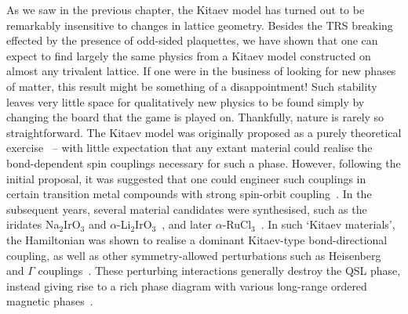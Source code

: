 
As we saw in the previous chapter, the Kitaev model has turned out to be remarkably insensitive to changes in lattice geometry. Besides the TRS breaking effected by the presence of odd-sided plaquettes, we have shown that one can expect to find largely the same physics from a Kitaev model constructed on almost any trivalent lattice. If one were in the business of looking for new phases of matter, this result might be something of a disappointment! Such stability leaves very little space for qualitatively new physics to be found simply by changing the board that the game is played on. Thankfully, nature is rarely so straightforward. The Kitaev model was originally proposed as a purely theoretical exercise~\cite{kitaev_anyons_2006} -- with little expectation that any extant material could realise the bond-dependent spin couplings necessary for such a phase. However, following the initial proposal, it was suggested that one could engineer such couplings in certain transition metal compounds with strong spin-orbit coupling~\cite{trebst_kitaev_2022,jackeli_mott_2009, chaloupka_kitaev-heisenberg_2010}. In the subsequent years, several material candidates were synthesised, such as the iridates Na$_2$IrO$_3$ and $\alpha$-Li$_2$IrO$_3$~\cite{singh_antiferromagnetic_2010, singh_relevance_2012,revelli_fingerprints_2020}, and later $\alpha$-RuCl$_3$~\cite{sandilands_scattering_2015,banerjee_proximate_2016}. In such `Kitaev materials', the Hamiltonian was shown to realise a dominant Kitaev-type bond-directional coupling, as well as other symmetry-allowed perturbations such as Heisenberg and $\Gamma$ couplings~\cite{rau_generic_2014}. These perturbing interactions generally destroy the QSL phase, instead giving rise to a rich phase diagram with various long-range ordered magnetic phases~\cite{chaloupka_zigzag_2013,rau_spin-orbit_2016, gohlke_dynamics_2017}. 


